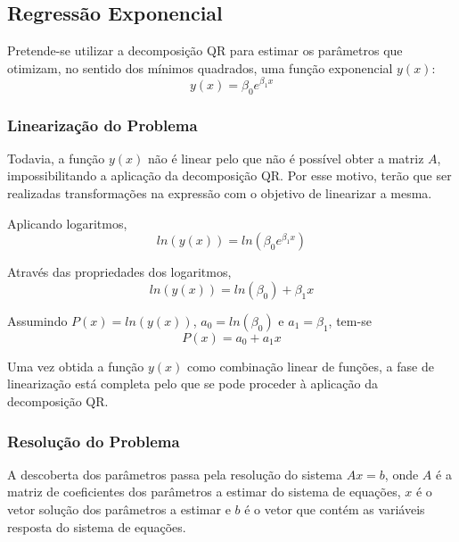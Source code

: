 \documentclass[]{article}
\numberwithin{equation}{subsection}
\begin{document}
\newpage
\subsection{Regressão Exponencial} \label{exp_aplicado_qr}

Pretende-se utilizar a decomposição QR para estimar os parâmetros que
otimizam, no sentido dos mínimos quadrados, uma função exponencial
\(y(x)\): \begin{equation}
y(x)=\beta_{0} e^{\beta_{1}x}
\end{equation}

\subsubsection{Linearização do Problema}

Todavia, a função \(y(x)\) não é linear pelo que não é possível obter a
matriz \(A\), impossibilitando a aplicação da decomposição QR. Por esse
motivo, terão que ser realizadas transformações na expressão com o
objetivo de linearizar a mesma.

Aplicando logaritmos, \begin{equation}
ln(y(x))=ln(\beta_{0} e^{\beta_{1}x})
\end{equation}

Através das propriedades dos logaritmos,
\begin{equation} \label{eq:exp_linearizada}
ln(y(x))=ln(\beta_{0}) + \beta_{1}x
\end{equation}

Assumindo \(P(x)=ln(y(x))\), \(a_0=ln(\beta_{0})\) e \(a_1=\beta_{1}\),
tem-se \begin{equation}
P(x)=a_0 + a_1x
\end{equation}

Uma vez obtida a função \(y(x)\) como combinação linear de funções, a
fase de linearização está completa pelo que se pode proceder à aplicação
da decomposição QR.

\subsubsection{Resolução do Problema}

A descoberta dos parâmetros passa pela resolução do sistema \(Ax=b\),
onde \(A\) é a matriz de coeficientes dos parâmetros a estimar do
sistema de equações, \(x\) é o vetor solução dos parâmetros a estimar e
\(b\) é o vetor que contém as variáveis resposta do sistema de equações.
\end{document}
